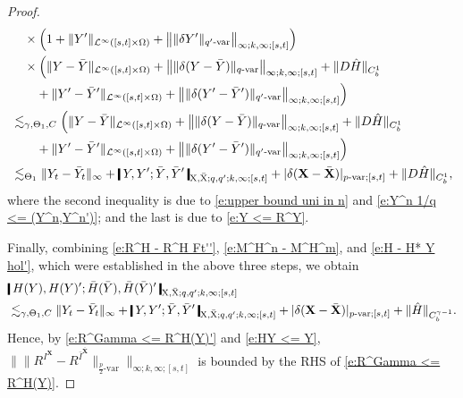 \documentclass[11pt,reqno]{amsart}
\numberwithin{equation}{section}
\newcommand{\shortthickbar}{%
  \vcenter{\hbox{\rule{1.8pt}{2.2ex}}}%
}
\newcommand{\thicknm}[1]{%
  \mathopen{\shortthickbar}%
  \mkern4mu #1 \mkern4mu%
  \mathclose{\shortthickbar}%
}
\begin{document}
\begin{proof}
\begin{equation}
\begin{aligned}
&\quad \times \Big( 1 + \|Y'\|_{\mathcal L^{\infty}([s,t] \times \Omega)} + \big\| \|\delta Y'\|_{q'\text{-}\mathrm{var}} \big\|_{\infty;k,\infty;[s,t]} \Big)\\
&\quad \times \Big( \|Y - \bar Y\|_{\mathcal L^{\infty}([s,t] \times \Omega)} + \big\| \|\delta (Y - \bar Y)\|_{q\text{-}\mathrm{var}} \big\|_{\infty;k,\infty;[s,t]} + \|D \hat H\|_{C^{1}_{b}}\\ 
&\quad\quad + \|Y' - \bar Y'\|_{\mathcal L^{\infty}([s,t] \times \Omega)} + \big\| \| \delta(Y' - \bar Y') \|_{q'\text{-}\mathrm{var}} \big\|_{\infty;k,\infty;[s,t]} \Big)\\
&\lesssim_{\gamma,\Theta_1,C} \Big( \|Y - \bar Y\|_{\mathcal L^{\infty}([s,t] \times \Omega)} + \big\| \|\delta (Y - \bar Y)\|_{q\text{-}\mathrm{var}} \big\|_{\infty;k,\infty;[s,t]} + \|D \hat H\|_{C^{1}_{b}}\\ 
&\quad\quad + \|Y' - \bar Y'\|_{\mathcal L^{\infty}([s,t] \times \Omega)} + \big\| \| \delta(Y' - \bar Y') \|_{q'\text{-}\mathrm{var}} \big\|_{\infty;k,\infty;[s,t]} \Big)\\
&\lesssim_{\Theta_{1}} \|Y_t - \bar Y_t\|_{\infty} + \thicknm{Y ,Y'; \bar Y, \bar Y'}_{\mathrm X,\bar{\mathrm X};q,q';k,\infty;[s,t]} + |\delta ( \mathbf X - \bar{\mathbf X} )|_{p\text{-}\mathrm{var};[s,t]} + \|D\hat H\|_{C^{1}_{b}},
\end{aligned}
\end{equation}
where the second inequality is due to \eqref{e:upper bound uni in n} and \eqref{e:Y^n 1/q <= (Y^n,Y^n')}; and the last is due to \eqref{e:Y <= R^Y}.


Finally, combining \eqref{e:R^H - R^H Ft''}, \eqref{e:M^H^n - M^H^m}, and \eqref{e:H - H* Y hol'}, which were established in the above three steps, we obtain 
\begin{equation}\label{e:HY <= Y}
\begin{aligned}
&\thicknm{H(Y),H(Y)' ; \bar H(\bar Y), \bar H(\bar Y)'}_{\mathrm X,\bar{\mathrm X};q,q';k,\infty;[s,t]} \\
&\lesssim_{\gamma,\Theta_{1},C} \|Y_t - \bar Y_t\|_{\infty} + \thicknm{Y ,Y'; \bar Y, \bar Y'}_{\mathrm X,\bar{\mathrm X};q,q';k,\infty;[s,t]} + |\delta (\mathbf X - \bar{\mathbf X}) |_{p\text{-}\mathrm{var};[s,t]} + \|\hat H\|_{C^{\gamma - 1}_{b}}. 
\end{aligned}
\end{equation}
Hence, by \eqref{e:R^Gamma <= R^H(Y)'} and \eqref{e:HY <= Y}, $\| \|R^{I^{\mathbf X}} - R^{\bar I^{\bar{\mathbf X}}}\|_{\frac{p}{2}\text{-}\mathrm{var}} \|_{\infty;k,\infty;[s,t]}$ is bounded by the RHS of \eqref{e:R^Gamma <= R^H(Y)}. 


\end{proof}
\end{document}
